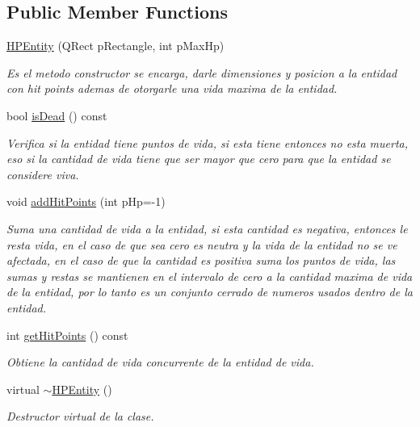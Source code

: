 \subsection*{Public Member Functions}
\begin{DoxyCompactItemize}
\item 
\hyperlink{class_h_p_entity_a3351ec6d47cbf4e5c178b54e056adcbe}{H\-P\-Entity} (Q\-Rect p\-Rectangle, int p\-Max\-Hp)
\begin{DoxyCompactList}\small\item\em Es el metodo constructor se encarga, darle dimensiones y posicion a la entidad con hit points ademas de otorgarle una vida maxima de la entidad. \end{DoxyCompactList}\item 
bool \hyperlink{class_h_p_entity_a43761d5af8e1883911c3e3b7ad9170df}{is\-Dead} () const 
\begin{DoxyCompactList}\small\item\em Verifica si la entidad tiene puntos de vida, si esta tiene entonces no esta muerta, eso si la cantidad de vida tiene que ser mayor que cero para que la entidad se considere viva. \end{DoxyCompactList}\item 
void \hyperlink{class_h_p_entity_a9cd0830a4369e036069aba8bdd37f703}{add\-Hit\-Points} (int p\-Hp=-\/1)
\begin{DoxyCompactList}\small\item\em Suma una cantidad de vida a la entidad, si esta cantidad es negativa, entonces le resta vida, en el caso de que sea cero es neutra y la vida de la entidad no se ve afectada, en el caso de que la cantidad es positiva suma los puntos de vida, las sumas y restas se mantienen en el intervalo de cero a la cantidad maxima de vida de la entidad, por lo tanto es un conjunto cerrado de numeros usados dentro de la entidad. \end{DoxyCompactList}\item 
int \hyperlink{class_h_p_entity_ab66e8858b5562dd629052cd3770479c0}{get\-Hit\-Points} () const 
\begin{DoxyCompactList}\small\item\em Obtiene la cantidad de vida concurrente de la entidad de vida. \end{DoxyCompactList}\item 
\hypertarget{class_h_p_entity_a583b0e71da4f6e1446768e74f5c392dd}{virtual \hyperlink{class_h_p_entity_a583b0e71da4f6e1446768e74f5c392dd}{$\sim$\-H\-P\-Entity} ()}\label{class_h_p_entity_a583b0e71da4f6e1446768e74f5c392dd}

\begin{DoxyCompactList}\small\item\em Destructor virtual de la clase. \end{DoxyCompactList}\end{DoxyCompactItemize}
